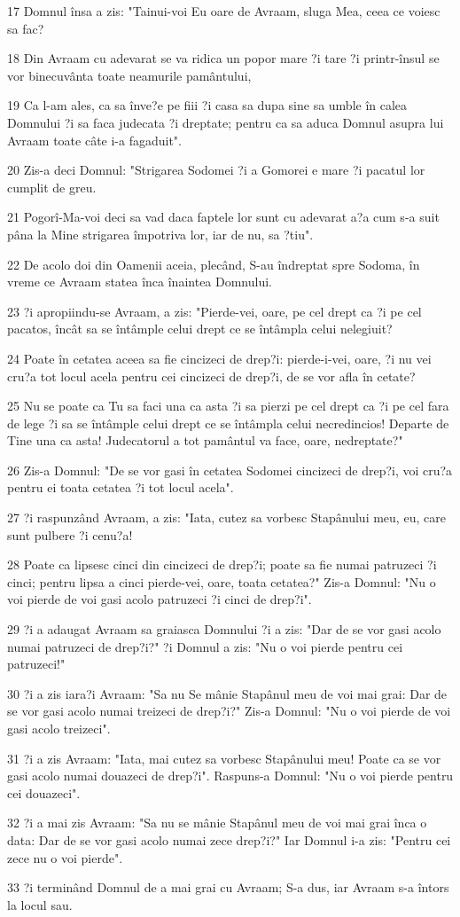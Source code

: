 \par 17 Domnul însa a zis: "Tainui-voi Eu oare de Avraam, sluga Mea, ceea ce voiesc sa fac?
\par 18 Din Avraam cu adevarat se va ridica un popor mare ?i tare ?i printr-însul se vor binecuvânta toate neamurile pamântului,
\par 19 Ca l-am ales, ca sa înve?e pe fiii ?i casa sa dupa sine sa umble în calea Domnului ?i sa faca judecata ?i dreptate; pentru ca sa aduca Domnul asupra lui Avraam toate câte i-a fagaduit".
\par 20 Zis-a deci Domnul: "Strigarea Sodomei ?i a Gomorei e mare ?i pacatul lor cumplit de greu.
\par 21 Pogorî-Ma-voi deci sa vad daca faptele lor sunt cu adevarat a?a cum s-a suit pâna la Mine strigarea împotriva lor, iar de nu, sa ?tiu".
\par 22 De acolo doi din Oamenii aceia, plecând, S-au îndreptat spre Sodoma, în vreme ce Avraam statea înca înaintea Domnului.
\par 23 ?i apropiindu-se Avraam, a zis: "Pierde-vei, oare, pe cel drept ca ?i pe cel pacatos, încât sa se întâmple celui drept ce se întâmpla celui nelegiuit?
\par 24 Poate în cetatea aceea sa fie cincizeci de drep?i: pierde-i-vei, oare, ?i nu vei cru?a tot locul acela pentru cei cincizeci de drep?i, de se vor afla în cetate?
\par 25 Nu se poate ca Tu sa faci una ca asta ?i sa pierzi pe cel drept ca ?i pe cel fara de lege ?i sa se întâmple celui drept ce se întâmpla celui necredincios! Departe de Tine una ca asta! Judecatorul a tot pamântul va face, oare, nedreptate?"
\par 26 Zis-a Domnul: "De se vor gasi în cetatea Sodomei cincizeci de drep?i, voi cru?a pentru ei toata cetatea ?i tot locul acela".
\par 27 ?i raspunzând Avraam, a zis: "Iata, cutez sa vorbesc Stapânului meu, eu, care sunt pulbere ?i cenu?a!
\par 28 Poate ca lipsesc cinci din cincizeci de drep?i; poate sa fie numai patruzeci ?i cinci; pentru lipsa a cinci pierde-vei, oare, toata cetatea?" Zis-a Domnul: "Nu o voi pierde de voi gasi acolo patruzeci ?i cinci de drep?i".
\par 29 ?i a adaugat Avraam sa graiasca Domnului ?i a zis: "Dar de se vor gasi acolo numai patruzeci de drep?i?" ?i Domnul a zis: "Nu o voi pierde pentru cei patruzeci!"
\par 30 ?i a zis iara?i Avraam: "Sa nu Se mânie Stapânul meu de voi mai grai: Dar de se vor gasi acolo numai treizeci de drep?i?" Zis-a Domnul: "Nu o voi pierde de voi gasi acolo treizeci".
\par 31 ?i a zis Avraam: "Iata, mai cutez sa vorbesc Stapânului meu! Poate ca se vor gasi acolo numai douazeci de drep?i". Raspuns-a Domnul: "Nu o voi pierde pentru cei douazeci".
\par 32 ?i a mai zis Avraam: "Sa nu se mânie Stapânul meu de voi mai grai înca o data: Dar de se vor gasi acolo numai zece drep?i?" Iar Domnul i-a zis: "Pentru cei zece nu o voi pierde".
\par 33 ?i terminând Domnul de a mai grai cu Avraam; S-a dus, iar Avraam s-a întors la locul sau.

